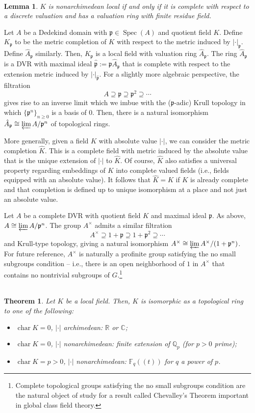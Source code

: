 \documentclass[11pt]{article}
\newcommand{\C}{\mathbb{C}}
\newcommand{\F}{\mathbb{F}}
\newcommand{\Q}{\mathbb{Q}}
\newcommand{\R}{\mathbb{R}}
\newcommand{\abs}[1]{\left\lvert#1\right\rvert}
\newcommand{\iso}{\cong}
\newcommand{\mf}[1]{\mathfrak{#1}}
\DeclareMathOperator{\ch}{char}
\DeclareMathOperator{\Spec}{Spec}
\renewcommand{\supset}{\supseteq}
\newcommand{\flim}{\varprojlim}
\newtheorem*{lemma*}{\\Lemma}
\newtheorem*{theorem*}{\\Theorem}
\begin{document}
\begin{lemma*}
$K$ is nonarchimedean local if and only if it is complete with respect to a discrete valuation and has a valuation ring with finite residue field.
\end{lemma*}

Let $A$ be a Dedekind domain with $\mf{p}\in\Spec(A)$ and quotient field $K$. Define $K_{\mf{p}}$ to be the metric completion of $K$ with respect to the metric induced by $\abs{\cdot}_{\mf{p}}$. Define $\hat{A}_{\mf{p}}$ similarly. Then, $K_{\mf{p}}$ is a local field with valuation ring $\hat{A}_{\mf{p}}$. The ring $\hat{A}_{\mf{p}}$ is a DVR with maximal ideal $\hat{\mf{p}}:=\mf{p}\hat{A}_{\mf{p}}$ that is complete with respect to the extension metric induced by $\abs{\cdot}_{\hat{\mf{p}}}$. For a slightly more algebraic perspective, the filtration 
$$A\supset\mf{p}\supset\mf{p}^2\supset\cdots$$
gives rise to an inverse limit which we imbue with the ($\mf{p}$-adic) Krull topology in which $\{\mf{p}^n\}_{n\geq0}$ is a basis of 0. Then, there is a natural isomorphism $\hat{A}_{\mf{p}}\iso\flim A/\mf{p}^n$ of topological rings.

More generally, given a field $K$ with absolute value $\abs{\cdot}$, we can consider the metric completion $\hat{K}$. This is a complete field with metric induced by the absolute value that is the unique extension of $\abs{\cdot}$ to $\hat{K}$. Of course, $\hat{K}$ also satisfies a universal property regarding embeddings of $K$ into complete valued fields (i.e., fields equipped with an absolute value). It follows that $\hat{K}=K$ if $K$ is already complete and that completion is defined up to unique isomorphism at a place and not just an absolute value.

Let $A$ be a complete DVR with quotient field $K$ and maximal ideal $\mf{p}$. As above, $A\iso\flim A/\mf{p}^n$. The group $A^{\times}$ admits a similar filtration
$$A^{\times}\supset1+\mf{p}\supset1+\mf{p}^2\supset\cdots$$
and Krull-type topology, giving a natural isomorphism $A^{\times}\iso\flim A^{\times}/(1+\mf{p}^n)$. For future reference, $A^{\times}$ is naturally a profinite group satisfying the no small subgroups condition -- i.e., there is an open neighborhood of $1$ in $A^{\times}$ that contains no nontrivial subgroups of $G$.\footnote{Complete topological groups satisfying the no small subgroups condition are the natural object of study for a result called Chevalley's Theorem important in global class field theory.}

\begin{theorem*}
Let $K$ be a local field. Then, $K$ is isomorphic as a topological ring to one of the following:
\begin{itemize}
\item $\ch K=0$, $\abs{\cdot}$ archimedean: $\R$ or $\C$;
\item $\ch K=0$, $\abs{\cdot}$ nonarchimedean: finite extension of $\Q_p$ (for $p>0$ prime);
\item $\ch K=p>0$, $\abs{\cdot}$ nonarchimedean: $\F_q((t))$ for $q$ a power of $p$.
\end{itemize}
\end{theorem*}
\end{document}
